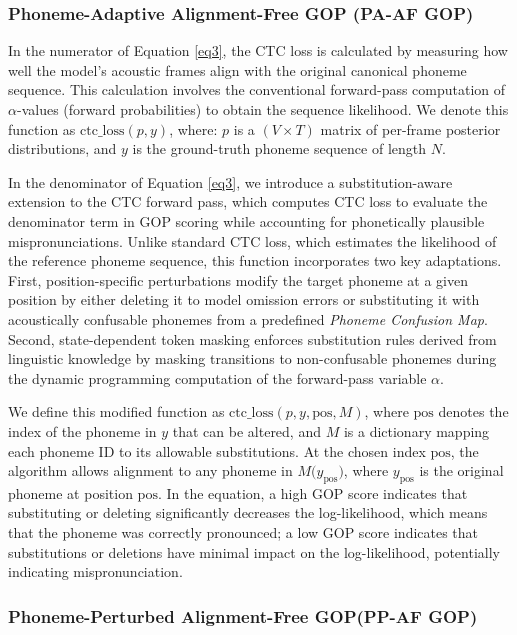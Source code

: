 \documentclass{Interspeech}
\begin{document}
\subsubsection{Phoneme-Adaptive Alignment-Free GOP (PA-AF GOP)}
In the numerator of Equation \ref{eq3}, the CTC loss is calculated by measuring how well the model's acoustic frames align with the original canonical phoneme sequence. This calculation involves the conventional forward-pass computation of $\alpha$-values (forward probabilities) to obtain the sequence likelihood. We denote this function as $\text{ctc\_loss}(p, y)$, where:
$p$ is a $(V \times T)$ matrix of per-frame posterior distributions, and $y$ is the ground-truth phoneme sequence of length $N$. 

In the denominator of Equation \ref{eq3}, we introduce a substitution-aware extension to the CTC forward pass, which computes CTC loss to evaluate the denominator term in GOP scoring while accounting for phonetically plausible mispronunciations. Unlike standard CTC loss, which estimates the likelihood of the reference phoneme sequence, this function incorporates two key adaptations. First, position-specific perturbations modify the target phoneme at a given position by either deleting it to model omission errors or substituting it with acoustically confusable phonemes from a predefined \textit{Phoneme Confusion Map}. Second, state-dependent token masking enforces substitution rules derived from linguistic knowledge by masking transitions to non-confusable phonemes during the dynamic programming computation of the forward-pass variable $\alpha$.


We define this modified function as $\text{ctc\_loss}(p, y, \text{pos}, M)$, where $\text{pos}$ denotes the index of the phoneme in $y$ that can be altered, and $M$ is a dictionary mapping each phoneme ID to its allowable substitutions. At the chosen index $\text{pos}$, the algorithm allows alignment to any phoneme in $M\bigl(y_{\text{pos}}\bigr)$, where $y_{\text{pos}}$ is the original phoneme at position $\text{pos}$. In the equation, a high GOP score indicates that substituting or deleting significantly decreases the log-likelihood, which means that the phoneme was correctly pronounced; a low GOP score indicates that substitutions or deletions have minimal impact on the log-likelihood, potentially indicating mispronunciation.



\subsubsection{Phoneme-Perturbed Alignment-Free GOP(PP-AF GOP)}
\end{document}
